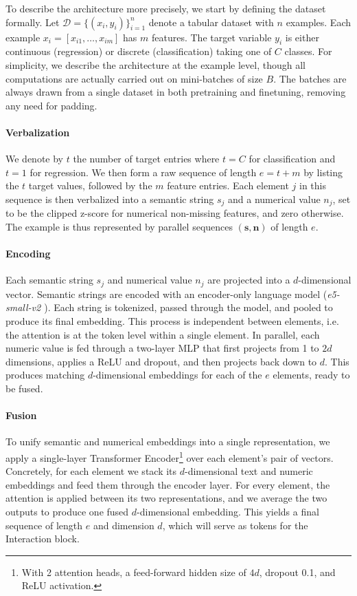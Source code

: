 To describe the architecture more precisely, we start by defining the dataset formally. Let $\mathcal{D} = \{(x_i, y_i)\}_{i=1}^n$ denote a tabular dataset with $n$ examples.  Each example $x_i = [x_{i1}, \dots, x_{im}]$ has $m$ features. The target variable $y_i$ is either continuous (regression) or discrete (classification) taking one of $C$ classes.  For simplicity, we describe the architecture at the example level, though all computations are actually carried out on mini-batches of size $B$. The batches are always drawn from a single dataset in both pretraining and finetuning, removing any need for padding.

\paragraph{Verbalization}  
We denote by $t$ the number of target entries where $t=C$ for classification and $t=1$ for regression. We then form a raw sequence of length $e = t + m$ by listing the $t$ target values, followed by the $m$ feature entries. Each element $j$ in this sequence is then verbalized into a semantic string $s_{j}$ and a numerical value $n_{j}$, set to be the clipped z-score for numerical non-missing features, and zero otherwise. The example is thus represented by parallel sequences $(\mathbf{s}, \mathbf{n})$ of length $e$.  

\paragraph{Encoding} Each semantic string $s_j$ and numerical value $n_j$ are projected into a $d$-dimensional vector. Semantic strings are encoded with an encoder-only language model (\textit{e5-small-v2 \cite{wang_text_2024}}). Each string is tokenized, passed through the model, and pooled to produce its final embedding. This process is independent between elements, i.e. the attention is at the token level within a single element. In parallel, each numeric value is fed through a two-layer MLP that first projects from 1 to $2d$ dimensions, applies a ReLU and dropout, and then projects back down to $d$. This produces matching $d$-dimensional embeddings for each of the $e$ elements, ready to be fused.

\paragraph{Fusion}  
To unify semantic and numerical embeddings into a single representation, we apply a single-layer Transformer Encoder\footnote{With 2 attention heads, a feed-forward hidden size of $4d$, dropout 0.1, and ReLU activation.} over each element's pair of vectors. Concretely, for each element we stack its $d$-dimensional text and numeric embeddings and feed them through the encoder layer. For every element, the attention is applied between its two representations, and we average the two outputs to produce one fused $d$-dimensional embedding. This yields a final sequence of length $e$ and dimension $d$, which will serve as tokens for the Interaction block.

